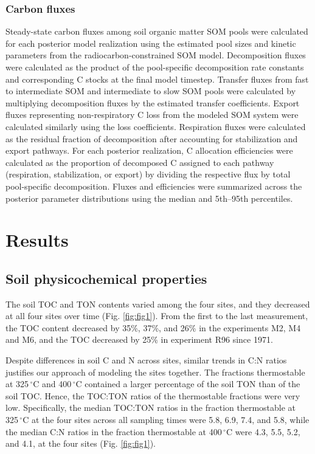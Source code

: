\documentclass[bg, manuscript]{copernicus}
\begin{document}
\subsubsection{Carbon fluxes}
Steady-state carbon fluxes among soil organic matter SOM pools were calculated for each posterior model realization using the estimated pool sizes and kinetic parameters from the radiocarbon-constrained SOM model. Decomposition fluxes were calculated as the product of the pool-specific decomposition rate constants and corresponding C stocks at the final model timestep. Transfer fluxes from fast to intermediate SOM and intermediate to slow SOM pools were calculated by multiplying decomposition fluxes by the estimated transfer coefficients. Export fluxes representing non-respiratory C loss from the modeled SOM system were calculated similarly using the loss coefficients. Respiration fluxes were calculated as the residual fraction of decomposition after accounting for stabilization and export pathways. For each posterior realization, C allocation efficiencies were calculated as the proportion of decomposed C assigned to each pathway (respiration, stabilization, or export) by dividing the respective flux by total pool-specific decomposition. Fluxes and efficiencies were summarized across the posterior parameter distributions using the median and 5th--95th percentiles.

\section{Results}

\subsection{Soil physicochemical properties}
The soil TOC and TON contents varied among the four sites, and they decreased at all four sites over time (Fig. \ref{fig:fig1}). From the first to the last measurement, the TOC content decreased by 35\%, 37\%, and 26\% in the experiments M2, M4 and M6, and the TOC decreased by 25\% in experiment R96 since 1971.

Despite differences in soil C and N across sites, similar trends in C:N ratios justifies our approach of modeling the sites together. The fractions thermostable at 325\,$^\circ\text{C}$ and 400\,$^\circ\text{C}$ contained a larger percentage of the soil TON than of the soil TOC. Hence, the TOC:TON ratios of the thermostable fractions were very low. Specifically, the median TOC:TON ratios in the fraction thermostable at 325\,$^\circ\text{C}$ at the four sites across all sampling times were 5.8, 6.9, 7.4, and 5.8, while the median C:N ratios in the fraction thermostable at 400\,$^\circ\text{C}$ were 4.3, 5.5, 5.2, and 4.1, at the four sites (Fig. \ref{fig:fig1}).
\end{document}
